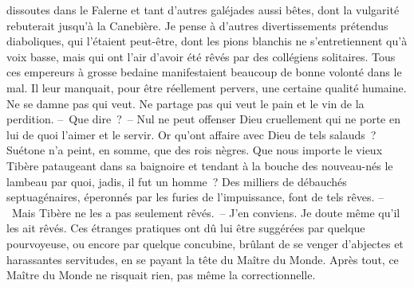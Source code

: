 \documentclass[french,twoside]{book} %
\newcommand{\astertri}{\medskip\par\centerline{\color{rubric}\large\selectfont{\syms ✻\,✻\,✻}}\medskip\par}%
\begin{document}
dissoutes dans le Falerne et tant d’autres galéjades aussi bêtes, dont la vulgarité rebuterait jusqu’à la Canebière. Je pense à d’autres divertissements prétendus diaboliques, qui l’étaient peut-être, dont les pions blanchis ne s’entretiennent qu’à voix basse, mais qui ont l’air d’avoir été rêvés par des collégiens solitaires. Tous ces empereurs à grosse bedaine manifestaient beaucoup de bonne volonté dans le mal. Il leur manquait, pour être réellement pervers, une certaine qualité humaine. Ne se damne pas qui veut. Ne partage pas qui veut le pain et le vin de la perdition. – Que dire ? – Nul ne peut offenser Dieu cruellement qui ne porte en lui de quoi l’aimer et le servir. Or qu’ont affaire avec Dieu de tels salauds ? Suétone n’a peint, en somme, que des rois nègres. Que nous importe le vieux Tibère pataugeant dans sa baignoire et tendant à la bouche des nouveau-nés le lambeau par quoi, jadis, il fut un homme ? Des milliers de débauchés septuagénaires, éperonnés par les furies de l’impuissance, font de tels rêves. – Mais Tibère ne les a pas seulement rêvés. – J’en conviens. Je doute même qu’il les ait rêvés. Ces étranges pratiques ont dû lui être suggérées par quelque pourvoyeuse, ou encore par quelque concubine, brûlant de se venger d’abjectes et harassantes servitudes, en se payant la tête du Maître du Monde. Après tout, ce Maître du Monde ne risquait rien, pas même la correctionnelle.\par

\astertri
\end{document}
